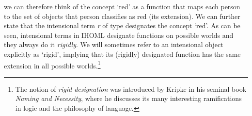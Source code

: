 \begin{isabellebody}
\begin{isamarkuptext}
{ we can therefore think of the concept `red' as a function that maps each person to the set of objects that person
 classifies as red (its extension). We can further state that the intensional term \emph{r} of type  designates the concept `red'.
 As can be seen, intensional terms in IHOML designate functions on possible worlds and they always do it \emph{rigidly}. 
 We will sometimes refer to an intensional object explicitly as `rigid', implying that its (rigidly) designated function has
 the same extension in all possible worlds.\footnote{The notion of \emph{rigid designation} was introduced by Kripke in his seminal 
 book \emph{Naming and Necessity}, where he discusses its many interesting ramifications in logic and the philosophy of language.}}%
\end{isamarkuptext}\isamarkuptrue%
%
\begin{isamarkuptext}%
%
\end{isamarkuptext}\isamarkuptrue%
%
\begin{isamarkuptext}%
%
\end{isamarkuptext}\isamarkuptrue%
%
\begin{isamarkuptext}%

\end{isamarkuptext}
\end{isabellebody}
